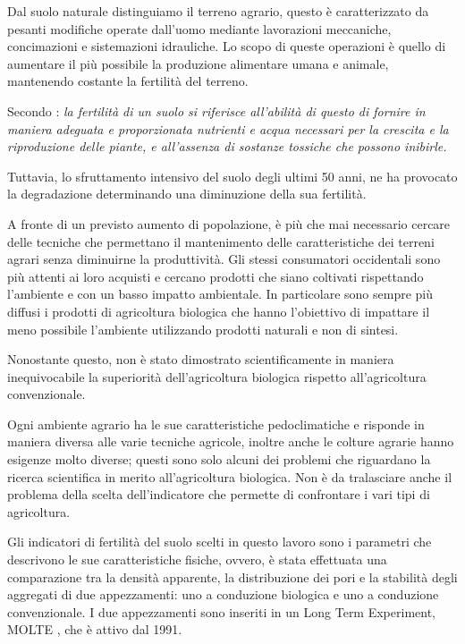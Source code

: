 \documentclass[11pt, a4paper, openright, titlepage, final, language = italian]{book}
\begin{document}

Dal suolo naturale distinguiamo il terreno agrario, questo è
caratterizzato da pesanti modifiche operate dall'uomo mediante
lavorazioni meccaniche, concimazioni e sistemazioni idrauliche.  Lo
scopo di queste operazioni è quello di aumentare il più possibile la
produzione alimentare umana e animale, mantenendo costante la
fertilit\`a del terreno.  

Secondo \citet{ellis1996soil}: \textit{la
  fertilit\`a di un suolo si riferisce all'abilit\`a di questo di
  fornire in maniera adeguata e proporzionata nutrienti e acqua
  necessari per la crescita e la riproduzione delle piante, e
  all'assenza di sostanze tossiche che possono inibirle.}

Tuttavia, lo sfruttamento intensivo del suolo degli ultimi 50 anni, ne ha
provocato la degradazione determinando una diminuzione della sua
fertilit\`a.

A fronte di un previsto aumento di popolazione, \`e pi\`u che mai
necessario cercare delle tecniche che permettano il mantenimento delle
caratteristiche dei terreni agrari senza diminuirne la
produttivit\`a. Gli stessi consumatori occidentali sono pi\`u attenti
ai loro acquisti e cercano prodotti che siano coltivati rispettando
l'ambiente e con un basso impatto ambientale. In particolare sono
sempre pi\`u diffusi i prodotti di agricoltura biologica che hanno
l'obiettivo di impattare il meno possibile l'ambiente utilizzando
prodotti naturali e non di sintesi.

Nonostante questo, non \`e stato dimostrato scientificamente in maniera
inequivocabile la superiorit\`a dell'agricoltura biologica rispetto
all'agricoltura convenzionale. 

Ogni ambiente agrario ha le sue caratteristiche pedoclimatiche e
risponde in maniera diversa alle varie tecniche agricole, inoltre 
anche le colture agrarie hanno esigenze molto diverse; questi sono solo
alcuni dei problemi che riguardano la ricerca scientifica in merito
all'agricoltura biologica. Non \`e da tralasciare anche il problema
della scelta dell'indicatore che permette di confrontare i vari tipi
di agricoltura.

Gli indicatori di fertilit\`a del suolo scelti in questo lavoro sono i
parametri che descrivono le sue caratteristiche fisiche, ovvero, \`e
stata effettuata una comparazione tra la densit\`a apparente,
la distribuzione dei pori e la stabilit\`a  degli aggregati di due
appezzamenti: uno a conduzione biologica e uno a conduzione convenzionale.
I due appezzamenti sono inseriti in un Long Term
Experiment, MOLTE \citep{MOLTE}, che \`e attivo dal 1991.
\end{document}
